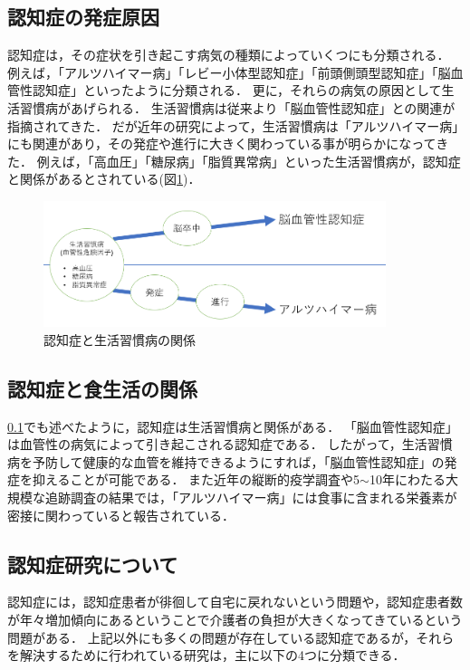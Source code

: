 \documentclass[../report]{subfiles}
\begin{document}
\subsection{認知症の発症原因} \label{sec:cause}
認知症は，その症状を引き起こす病気の種類によっていくつにも分類される．
例えば，「アルツハイマー病」「レビー小体型認知症」「前頭側頭型認知症」「脳血管性認知症」といったように分類される．
更に，それらの病気の原因として生活習慣病があげられる．
生活習慣病は従来より「脳血管性認知症」との関連が指摘されてきた．
だが近年の研究によって，生活習慣病は「アルツハイマー病」にも関連があり，その発症や進行に大きく関わっている事が明らかになってきた\cite{seikatsu}．
例えば，「高血圧」「糖尿病」「脂質異常病」といった生活習慣病が，認知症と関係があるとされている(図\ref{fig:relation-dementia-life-habit})．
\begin{figure}[htbp]
    \begin{center}
        \includegraphics[width=10cm]{imgs/1_relation-dementia-life-habit.png}
        \caption{認知症と生活習慣病の関係}
        \label{fig:relation-dementia-life-habit}
    \end{center}
\end{figure}


\subsection{認知症と食生活の関係}
\ref{sec:cause}でも述べたように，認知症は生活習慣病と関係がある．
「脳血管性認知症」は血管性の病気によって引き起こされる認知症である．
したがって，生活習慣病を予防して健康的な血管を維持できるようにすれば，「脳血管性認知症」の発症を抑えることが可能である．
また近年の縦断的疫学調査や5$\sim$10年にわたる大規模な追跡調査の結果では，「アルツハイマー病」には食事に含まれる栄養素が密接に関わっていると報告されている\cite{nutrition-dementia-00}\cite{nutrition-dementia-01}．


\subsection{認知症研究について}
認知症には，認知症患者が徘徊して自宅に戻れないという問題や，認知症患者数が年々増加傾向にあるということで介護者の負担が大きくなってきているという問題がある．
上記以外にも多くの問題が存在している認知症であるが，それらを解決するために行われている研究は，主に以下の4つに分類できる．
\end{document}
